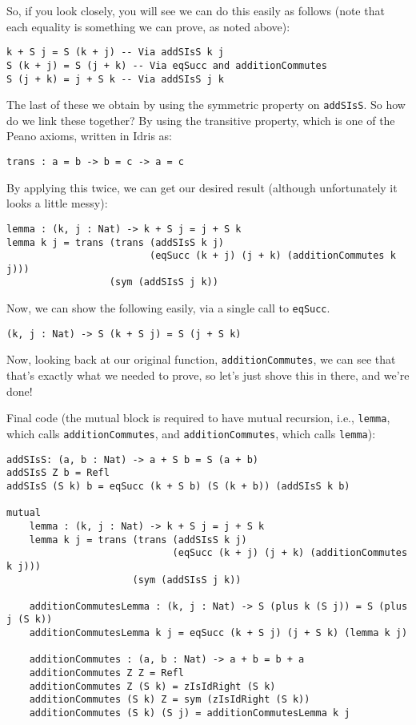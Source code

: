 \documentclass{article}
\newcommand{\inline}[1]{\texttt{#1}}
\begin{document}
So, if you look closely, you will see we can do this easily as follows (note that each equality is something we can prove, as noted above):

\begin{verbatim}
k + S j = S (k + j) -- Via addSIsS k j
S (k + j) = S (j + k) -- Via eqSucc and additionCommutes
S (j + k) = j + S k -- Via addSIsS j k
\end{verbatim}

The last of these we obtain by using the symmetric property on \inline{addSIsS}.
So how do we link these together?
By using the transitive property, which is one of the Peano axioms, written in Idris as:

\begin{verbatim}
trans : a = b -> b = c -> a = c
\end{verbatim}

By applying this twice, we can get our desired result (although unfortunately it looks a little messy):

\begin{verbatim}
lemma : (k, j : Nat) -> k + S j = j + S k
lemma k j = trans (trans (addSIsS k j)
                         (eqSucc (k + j) (j + k) (additionCommutes k j)))
                  (sym (addSIsS j k))
\end{verbatim}

Now, we can show the following easily, via a single call to \inline{eqSucc}.

\begin{verbatim}
(k, j : Nat) -> S (k + S j) = S (j + S k)
\end{verbatim}

Now, looking back at our original function, \inline{additionCommutes}, we can see that that’s exactly what we needed to prove, so let’s just shove this in there, and we’re done!

Final code (the mutual block is required to have mutual recursion, i.e., \inline{lemma}, which calls \inline{additionCommutes}, and \inline{additionCommutes}, which calls \inline{lemma}):

\begin{verbatim}
addSIsS: (a, b : Nat) -> a + S b = S (a + b)
addSIsS Z b = Refl
addSIsS (S k) b = eqSucc (k + S b) (S (k + b)) (addSIsS k b)

mutual
    lemma : (k, j : Nat) -> k + S j = j + S k
    lemma k j = trans (trans (addSIsS k j)
                             (eqSucc (k + j) (j + k) (additionCommutes k j)))
                      (sym (addSIsS j k))

    additionCommutesLemma : (k, j : Nat) -> S (plus k (S j)) = S (plus j (S k))
    additionCommutesLemma k j = eqSucc (k + S j) (j + S k) (lemma k j)

    additionCommutes : (a, b : Nat) -> a + b = b + a
    additionCommutes Z Z = Refl
    additionCommutes Z (S k) = zIsIdRight (S k)
    additionCommutes (S k) Z = sym (zIsIdRight (S k))
    additionCommutes (S k) (S j) = additionCommutesLemma k j
\end{verbatim}
\end{document}
